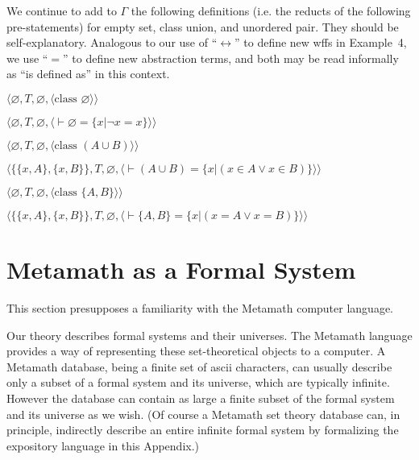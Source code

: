 We continue to add to $\Gamma$ the following definitions
(i.e. the reducts of the following pre-statements) for empty
set, class union, and unordered
pair.  They should be self-explanatory.  Analogous to our
use of ``$\leftrightarrow$'' to define new wffs in Example~4, we use ``$=$''
to define new abstraction terms, and both may be read informally as ``is
defined as'' in this context.
\begin{list}{}{\itemsep 0.0pt}
      \item[] $\langle\varnothing,T,\varnothing,
               \langle \mbox{class\ }\varnothing\rangle\rangle$
      \item[] $\langle\varnothing,T,\varnothing,
               \langle \vdash \varnothing = \{ x | \lnot x = x \}
               \rangle\rangle$
      \item[] $\langle\varnothing,T,\varnothing,
               \langle \mbox{class\ }(A\cup B)\rangle\rangle$
      \item[] $\langle\{\{x,A\},\{x,B\}\},T,\varnothing,
               \langle \vdash ( A \cup B ) = \{ x | ( x \in A \vee x \in B ) \}
               \rangle\rangle$
      \item[] $\langle\varnothing,T,\varnothing,
               \langle \mbox{class\ }\{A,B\}\rangle\rangle$
      \item[] $\langle\{\{x,A\},\{x,B\}\},T,\varnothing,
               \langle \vdash \{ A , B \} = \{ x | ( x = A \vee x = B ) \}
               \rangle\rangle$
\end{list}

\section{Metamath as a Formal System}\label{theorymm}

This section presupposes a familiarity with the Metamath computer language.

Our theory describes formal systems and their universes.  The Metamath
language provides a way of representing these set-theoretical objects to
a computer.  A Metamath database, being a finite set of {\sc ascii}
characters, can usually describe only a subset of a formal system and
its universe, which are typically infinite.  However the database can
contain as large a finite subset of the formal system and its universe
as we wish.  (Of course a Metamath set theory database can, in
principle, indirectly describe an entire infinite formal system by
formalizing the expository language in this Appendix.)

